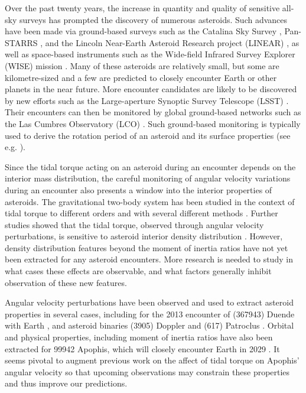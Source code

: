 \documentclass[fleqn,usenatbib]{mnras}
\begin{document}
Over the past twenty years, the increase in quantity and quality of sensitive all-sky surveys has prompted the discovery of numerous asteroids. Such advances have been made via ground-based surveys such as the Catalina Sky Survey \cite{larson1998catalina}, Pan-STARRS \cite{kaiser2002pan}, and the Lincoln Near-Earth Asteroid Research project (LINEAR) \cite{stokes2000lincoln}, as well as space-based instruments such as the Wide-field Infrared Survey Explorer (WISE) mission \cite{wright2010wide}. Many of these asteroids are relatively small, but some are kilometre-sized and a few are predicted to closely encounter Earth or other planets in the near future. More encounter candidates are likely to be discovered by new efforts such as the Large-aperture Synoptic Survey Telescope (LSST) \cite{tyson2002large}. Their encounters can then be monitored by global ground-based networks such as the Las Cumbres Observatory (LCO) \cite{brown2013cumbres}. Such ground-based monitoring is typically used to derive the rotation period of an asteroid and its surface properties (see e.g. \cite{10.1093/mnras/stab1252}).

Since the tidal torque acting on an asteroid during an encounter depends on the interior mass distribution, the careful monitoring of angular velocity variations during an encounter also presents a window into the interior properties of asteroids. The gravitational two-body system has
been studied in the context of tidal torque to different orders
and with several different methods \cite{paul88, SCHEERES2000106, ashenberg07, BOUE2009750, HouMar2017}. Further studies showed that the tidal torque, observed through angular velocity perturbations, is sensitive to asteroid interior density distribution \cite{Naidu_2015, Makarov2022ChaosOO, scheeres2004evolution}. However, density distribution features beyond the moment of inertia ratios have not yet been extracted for any asteroid encounters. More research is needed to study in what cases these effects are observable, and what
factors generally inhibit observation of these new features. 

Angular velocity perturbations have been observed and
used to extract asteroid properties in several cases, including
for the 2013 encounter of (367943) Duende with Earth \cite{MOSKOVITZ2020113519, benson2020spin}, and asteroid
binaries (3905) Doppler and (617) Patroclus \cite{DESCAMPS2020113726, BERTHIER2020113990}. Orbital and physical properties, including moment of inertia ratios have also been extracted for 99942 Apophis, which will closely encounter Earth in 2029 \cite{yu2014numerical, hirabayashi2021finite, valvano2022apophis, Lee2022Apophis}. It seems pivotal to augment previous work on the affect of tidal torque on Apophis' angular velocity \cite{souchay2014rotational, souchay2018changes} so that upcoming observations may constrain these properties and thus improve our predictions.
\end{document}

